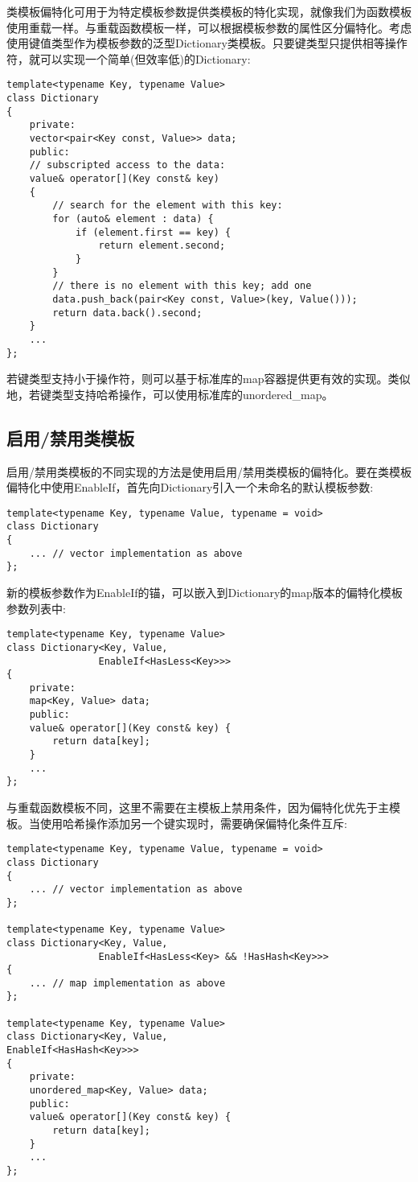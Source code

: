 
类模板偏特化可用于为特定模板参数提供类模板的特化实现，就像我们为函数模板使用重载一样。与重载函数模板一样，可以根据模板参数的属性区分偏特化。考虑使用键值类型作为模板参数的泛型Dictionary类模板。只要键类型只提供相等操作符，就可以实现一个简单(但效率低)的Dictionary:

\begin{lstlisting}[style=styleCXX]
template<typename Key, typename Value>
class Dictionary
{
	private:
	vector<pair<Key const, Value>> data;
	public:
	// subscripted access to the data:
	value& operator[](Key const& key)
	{
		// search for the element with this key:
		for (auto& element : data) {
			if (element.first == key) {
				return element.second;
			}
		}
		// there is no element with this key; add one
		data.push_back(pair<Key const, Value>(key, Value()));
		return data.back().second;
	}
	...
};
\end{lstlisting}

若键类型支持小于操作符，则可以基于标准库的map容器提供更有效的实现。类似地，若键类型支持哈希操作，可以使用标准库的unordered\_map。

\subsection{启用/禁用类模板}

启用/禁用类模板的不同实现的方法是使用启用/禁用类模板的偏特化。要在类模板偏特化中使用EnableIf，首先向Dictionary引入一个未命名的默认模板参数:

\begin{lstlisting}[style=styleCXX]
template<typename Key, typename Value, typename = void>
class Dictionary
{
	... // vector implementation as above
};
\end{lstlisting}

新的模板参数作为EnableIf的锚，可以嵌入到Dictionary的map版本的偏特化模板参数列表中:

\begin{lstlisting}[style=styleCXX]
template<typename Key, typename Value>
class Dictionary<Key, Value,
				EnableIf<HasLess<Key>>>
{
	private:
	map<Key, Value> data;
	public:
	value& operator[](Key const& key) {
		return data[key];
	}
	...
};
\end{lstlisting}

与重载函数模板不同，这里不需要在主模板上禁用条件，因为偏特化优先于主模板。当使用哈希操作添加另一个键实现时，需要确保偏特化条件互斥:

\begin{lstlisting}[style=styleCXX]
template<typename Key, typename Value, typename = void>
class Dictionary
{
	... // vector implementation as above
};

template<typename Key, typename Value>
class Dictionary<Key, Value,
				EnableIf<HasLess<Key> && !HasHash<Key>>> 
{
	... // map implementation as above
};

template<typename Key, typename Value>
class Dictionary<Key, Value,
EnableIf<HasHash<Key>>>
{
	private:
	unordered_map<Key, Value> data;
	public:
	value& operator[](Key const& key) {
		return data[key];
	}
	...
};
\end{lstlisting}

